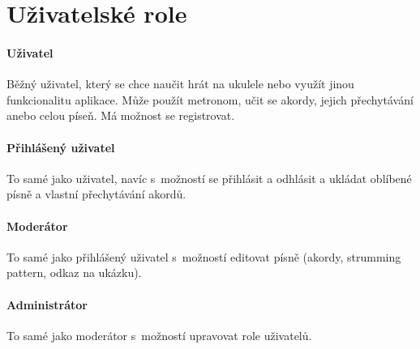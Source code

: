 \section{Uživatelské role}
\label{sc:user_roles}

\noindent \begin{minipage}{\textwidth}
    \paragraph{Uživatel}
    \begin{smallindent}{}
        Běžný uživatel, který se chce naučit hrát na ukulele nebo využít jinou funkcionalitu aplikace. Může použít metronom, učit se akordy, jejich přechytávání anebo celou píseň.
        Má možnost se registrovat.
    \end{smallindent}
\end{minipage}


\noindent \begin{minipage}{\textwidth}
    \paragraph{Přihlášený uživatel}
    \begin{smallindent}{}
        To samé jako uživatel, navíc s~možností se přihlásit a odhlásit a ukládat oblíbené písně a vlastní přechytávání akordů.
    \end{smallindent}
\end{minipage}

\noindent \begin{minipage}{\textwidth}
    \paragraph{Moderátor}
    \begin{smallindent}{}
        To samé jako přihlášený uživatel s~možností editovat písně (akordy, strumming pattern, odkaz na ukázku).
    \end{smallindent}
\end{minipage}

\noindent \begin{minipage}{\textwidth}
    \paragraph{Administrátor}
    \begin{smallindent}{}
        To samé jako moderátor s~možností upravovat role uživatelů.
    \end{smallindent}
\end{minipage}